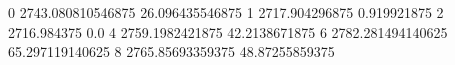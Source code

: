 0 2743.080810546875 26.096435546875
1 2717.904296875 0.919921875
2 2716.984375 0.0
4 2759.1982421875 42.2138671875
6 2782.281494140625 65.297119140625
8 2765.85693359375 48.87255859375
